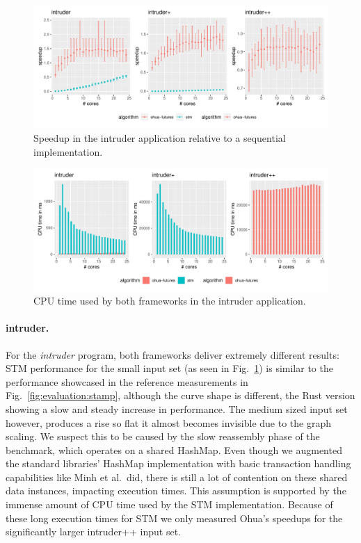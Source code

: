 \begin{figure}
    \centering
    \includegraphics[width=\textwidth,keepaspectratio]{gfx/results/intruder_comb}
    \caption{Speedup in the intruder application relative to a sequential implementation.}%
    \label{fig:evaluation:intruder}
\end{figure}

\begin{figure}
    \centering
    \includegraphics[width=\textwidth,keepaspectratio]{gfx/results/cpu_intruder_comb}
    \caption{CPU time used by both frameworks in the intruder application.}%
    \label{fig:evaluation:intruder-cpu}
\end{figure}

\paragraph{intruder.} For the \emph{intruder} program, both frameworks deliver extremely different results:
STM performance for the small input set (as seen in Fig.~\ref{fig:evaluation:intruder}) is similar to the performance showcased in the reference measurements in Fig.~\ref{fig:evaluation:stamp}, although the curve shape is different, the Rust version showing a slow and steady increase in performance.
The medium sized input set however, produces a rise so flat it almost becomes invisible due to the graph scaling.
We suspect this to be caused by the slow reassembly phase of the benchmark, which operates on a shared HashMap.
Even though we augmented the standard libraries' HashMap implementation with basic transaction handling capabilities like Minh et al.\ did, there is still a lot of contention on these shared data instances, impacting execution times.
This assumption is supported by the immense amount of CPU time used by the STM implementation.
Because of these long execution times for STM we only measured Ohua's speedups for the significantly larger intruder++ input set.

